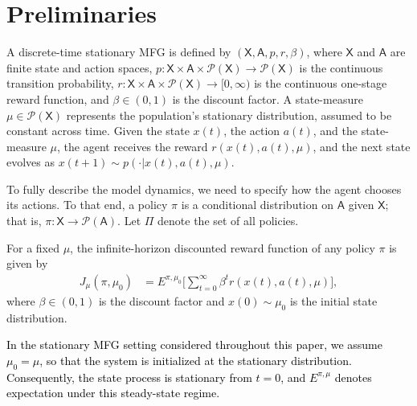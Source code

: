 \documentclass[11pt]{article}
\newcommand{\sX}{{\mathsf X}}
\newcommand{\sA}{{\mathsf A}}
\newcommand{\Pnew}{{\mathcal P}}
\newcommand{\tb}[1]{\textcolor{black}{#1}} %
\begin{document}
\section{Preliminaries}\label{me-irl-mfg}
A discrete-time stationary MFG is defined by \((\sX, \sA, p, r, \beta)\), where \(\sX\) and \(\sA\) are finite state and action spaces, \(p: \sX \times \sA \times \Pnew(\sX) \to \Pnew(\sX)\) is the continuous transition probability, \(r: \sX \times \sA \times \Pnew(\sX) \to [0,\infty)\) is the continuous one-stage reward function, and \(\beta \in (0,1)\) is the discount factor. A state-measure \(\mu \in \Pnew(\sX)\) represents the population's stationary distribution, assumed to be constant across time. Given the state \(x(t)\), the action \(a(t)\), and the state-measure \(\mu\), the agent receives the reward \(r(x(t),a(t),\mu)\), and the next state evolves as \(x(t+1) \sim p(\cdot|x(t),a(t),\mu)\).


To fully describe the model dynamics, we need to specify how the agent chooses its actions. To that end, a policy $\pi$ is a conditional distribution on $\sA$ given $\sX$; that is, $\pi: \sX \rightarrow \Pnew(\sA)$. Let $\Pi$ denote the set of all policies. 


For a fixed $\mu$, the infinite-horizon discounted reward function of any policy $\pi$ is given by
\begin{align}
J_{\mu}(\pi,\mu_0) &= E^{\pi,\mu_0}\biggl[ \sum_{t=0}^{\infty} \beta^t r(x(t),a(t),\mu) \biggr], \nonumber 
\end{align}
where $\beta \in (0,1)$ is the discount factor and $x(0) \sim \mu_0$ is the initial state distribution.

\tb{
In the stationary MFG setting considered throughout this paper, we assume \(\mu_0=\mu\), so that the system is initialized at the stationary distribution. Consequently, the state process is stationary from \(t=0\), and \(E^{\pi,\mu}\) denotes expectation under this steady-state regime.
}
\end{document}
